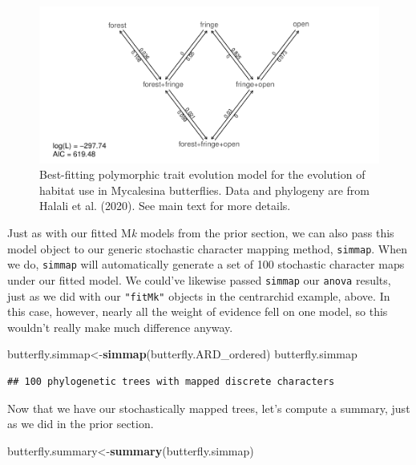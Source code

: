\documentclass[fleqn,10pt,lineno]{wlpeerj} %
\newenvironment{Shaded}{\begin{snugshade}}{\end{snugshade}}
\newcommand{\FunctionTok}[1]{\textcolor[rgb]{0.13,0.29,0.53}{\textbf{#1}}}
\newcommand{\NormalTok}[1]{#1}
\newcommand{\OtherTok}[1]{\textcolor[rgb]{0.56,0.35,0.01}{#1}}
\begin{document}
\begin{figure}
\includegraphics[width=1\linewidth]{Revell.phytools-v2_peerj_files/figure-latex/fig06-ordered-ard-fitpolyMk-1} \caption{Best-fitting polymorphic trait evolution model for the evolution of habitat use in Mycalesina butterflies. Data and phylogeny are from Halali et al. (2020). See main text for more details.}\label{fig:fig06-ordered-ard-fitpolyMk}
\end{figure}

Just as with our fitted M\emph{k} models from the prior section, we can also pass this model object to our generic stochastic character mapping method, \texttt{simmap}. When we do, \texttt{simmap} will automatically generate a set of 100 stochastic character maps under our fitted model. We could've likewise passed \texttt{simmap} our \texttt{anova} results, just as we did with our \texttt{"fitMk"} objects in the centrarchid example, above. In this case, however, nearly all the weight of evidence fell on one model, so this wouldn't really make much difference anyway.

\begin{Shaded}
\begin{Highlighting}[]
\NormalTok{butterfly.simmap}\OtherTok{\textless{}{-}}\FunctionTok{simmap}\NormalTok{(butterfly.ARD\_ordered)}
\NormalTok{butterfly.simmap}
\end{Highlighting}
\end{Shaded}

\begin{verbatim}
## 100 phylogenetic trees with mapped discrete characters
\end{verbatim}

Now that we have our stochastically mapped trees, let's compute a summary, just as we did in the prior section.

\begin{Shaded}
\begin{Highlighting}[]
\NormalTok{butterfly.summary}\OtherTok{\textless{}{-}}\FunctionTok{summary}\NormalTok{(butterfly.simmap)}
\end{Highlighting}
\end{Shaded}
\end{document}

